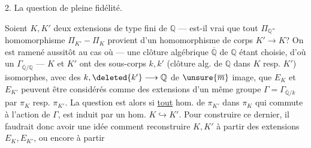 2. La question de pleine fidélité.

Soient $K,K'$ deux extensions de type fini de $\mathbb Q$ --- est-il vrai que tout $\Pi_{\mathbb Q}$-homomorphisme $\Pi_{K'}-\Pi_K$ provient d'un homomorphisme de corps $K'\longrightarrow K$? On est ramené aussitôt au cas où --- une clôture algébrique $\overline{\mathbb Q}$ de $\mathbb Q$ étant choisie, d'où un $\Gamma_{\overline{\mathbb Q}/\mathbb Q}$ --- $K$ et $K'$ ont des sous-corps $k,k'$ (clôture alg. de $\mathbb Q$ dans $K$ resp. $K'$) isomorphes, avec des   $k,\deleted{k'}\longrightarrow\mathbb Q$ de $\unsure{\overline m}$ image,  que $E_K$ et $E_{K'}$ peuvent être considérés comme des extensions d'un même groupe $\Gamma=\Gamma_{\overline{\mathbb Q}/k}$ par $\pi_K$ resp. $\pi_{K'}$. La question est alors si \uline{tout} hom. de $\pi_{K'}$ dans $\pi_K$ qui commute à l'action de $\Gamma$, est induit par un hom. $K\hookrightarrow K'$. Pour construire ce dernier, il faudrait donc avoir une idée comment reconstruire $K,K'$ à partir des extensions $E_K,E_{K'}$, ou encore à partir
